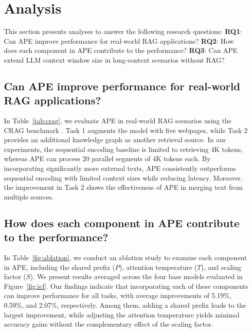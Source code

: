 \section{Analysis} 

This section presents analyses to answer the following research questions: \textbf{RQ1}: Can APE improve performance for real-world RAG applications? \textbf{RQ2}: How does each component in APE contribute to the performance? \textbf{RQ3}: Can APE extend LLM context window size in long-context scenarios without RAG?

\subsection{Can APE improve performance for real-world RAG applications?}

In Table~\ref{tab:crag}, we evaluate APE in real-world RAG scenarios using the CRAG benchmark \citep{yang2024crag}. Task 1 augments the model with five webpages, while Task 2 provides an additional knowledge graph as another retrieval source. In our experiments, the sequential encoding baseline is limited to retrieving 4K tokens, whereas APE can process 20 parallel segments of 4K tokens each. By incorporating significantly more external texts, APE consistently outperforms sequential encoding with limited context sizes while reducing latency. Moreover, the improvement in Task 2 shows the effectiveness of APE in merging text from multiple sources.



\subsection{How does each component in APE contribute to the performance?}



In Table~\ref{fig:ablation}, we conduct an ablation study to examine each component in APE, including the shared prefix ($P$), attention temperature ($T$), and scaling factor ($S$). We present results averaged across the four base models evaluated in Figure~\ref{fig:icl}. Our findings indicate that incorporating each of these components can improve performance for all tasks, with average improvements of 5.19\%, 0.59\%, and 2.07\%, respectively. Among them, adding a shared prefix leads to the largest improvement, while adjusting the attention temperature yields minimal accuracy gains without the complementary effect of the scaling factor.

